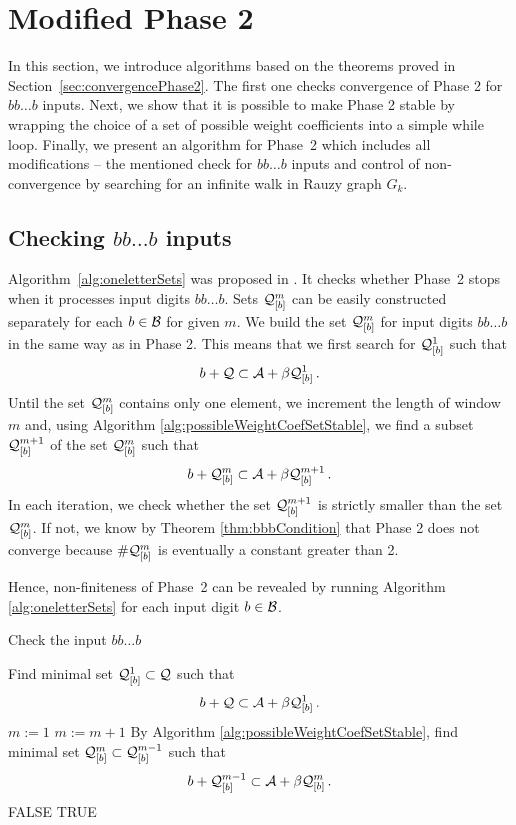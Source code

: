 \section{Modified Phase 2}
\label{sec:modifiedPhase2}

In this section, we introduce algorithms based on the theorems proved in Section~\ref{sec:convergencePhase2}. The first one checks convergence of Phase 2 for $bb\dots b$ inputs. Next, we show that it is possible to make Phase 2 stable by wrapping the choice of a set of possible weight coefficients into a simple while loop. Finally, we present an algorithm for Phase~2 which includes all modifications -- the mentioned check for $bb\dots b$ inputs and control of non-convergence by searching for an infinite walk in Rauzy graph $G_k$.

\subsection*{Checking $bb\dots b$ inputs}

Algorithm~\ref{alg:oneletterSets} was proposed in \cite{vu}. It checks whether Phase~2 stops when it processes input digits $bb\dots b$.
Sets $\mathcal{Q}_{[\scriptstyle b]}^{\scriptstyle m}$  can be easily constructed separately for each $b\in\mathcal{B}$ for given $m$. We build the set $\mathcal{Q}_{[\scriptstyle b]}^{\scriptstyle m}$ for input digits $bb\dots b$ in the same way as in Phase 2. This means that we first search for $\mathcal{Q}_{[\scriptstyle b]}^{\scriptstyle 1}$ such that 
$$
b + \mathcal{Q} \subset \mathcal{A} + \beta \mathcal{Q}_{[\scriptstyle b]}^{\scriptstyle 1}\,.
$$
Until the set $\mathcal{Q}_{[\scriptstyle b]}^{\scriptstyle m}$ contains only one element, we increment the length of  window $m$ and, using Algorithm \ref{alg:possibleWeightCoefSetStable}, we find a subset $\mathcal{Q}_{[\scriptstyle b]}^{\scriptstyle m+1}$ of the set $\mathcal{Q}_{[\scriptstyle b]}^{\scriptstyle m}$ such that
$$
b + \mathcal{Q}_{[\scriptstyle b]}^{\scriptstyle m} \subset \mathcal{A} + \beta \mathcal{Q}_{[\scriptstyle b]}^{\scriptstyle m+1}\,.
$$
In each iteration, we check whether the set $\mathcal{Q}_{[\scriptstyle b]}^{\scriptstyle m+1}$ is strictly smaller than the set $\mathcal{Q}_{[\scriptstyle b]}^{\scriptstyle m}$. If not, we know by Theorem \ref{thm:bbbCondition} that Phase 2 does not converge because $\#\mathcal{Q}_{[\scriptstyle b]}^{\scriptstyle m}$ is eventually a constant greater than 2.

Hence, non-finiteness of Phase~2 can be revealed by running Algorithm \ref{alg:oneletterSets} for each input digit $b\in\mathcal{B}$.
\begin{algorithm}
  \caption{Check the input $bb\dots b$}
    \label{alg:oneletterSets}
  \begin{algorithmic}[1]
    \STATE Find minimal set $\mathcal{Q}_{[\scriptstyle b]}^{\scriptstyle 1} \subset \mathcal{Q}$ such that
      $$
      b + \mathcal{Q} \subset \mathcal{A} + \beta \mathcal{Q}_{[\scriptstyle b]}^{\scriptstyle 1}\,.
      $$
      \vspace{-20pt}
    \STATE $m:=1$
        \STATE $m:= m +1$
        \STATE By Algorithm \ref{alg:possibleWeightCoefSetStable}, find minimal set $\mathcal{Q}_{[\scriptstyle b]}^{\scriptstyle m} \subset \mathcal{Q}_{[\scriptstyle b]}^{\scriptstyle m-1}$ such that
          $$
          b + \mathcal{Q}_{[\scriptstyle b]}^{\scriptstyle m-1} \subset \mathcal{A} + \beta \mathcal{Q}_{[\scriptstyle b]}^{\scriptstyle m}\,.
          $$  
          \vspace{-20pt}
            \RETURN FALSE
        \ENDIF
    \ENDWHILE  
    \RETURN TRUE
  \end{algorithmic}
\end{algorithm}


